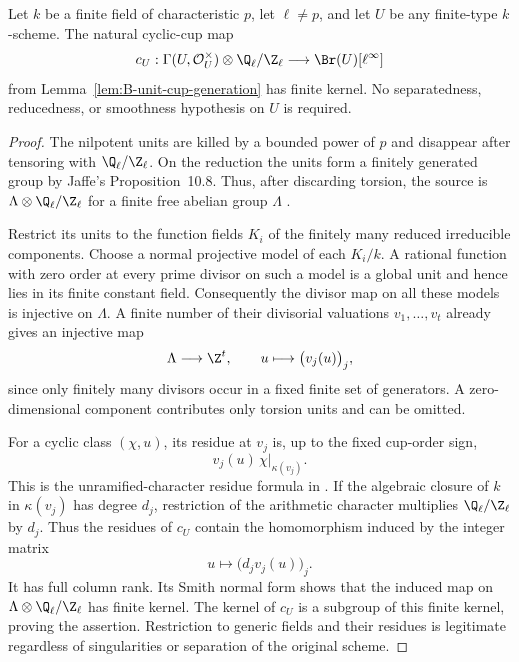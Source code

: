 \begin{lemma}
\label{lem:B-unit-cup-kernel}
Let \(k\) be a finite field of characteristic \(p\), let
\(\ell\ne p\), and let \(U\) be any finite-type
\(k\)-scheme.  The natural cyclic-cup map
\[
 c_U:\Gamma(U,\mathcal O_U^\times)\otimes
                 \Q_\ell/\Z_\ell
       \longrightarrow\Br(U)[\ell^\infty]
\]
from Lemma~\ref{lem:B-unit-cup-generation} has finite kernel.
No separatedness, reducedness, or smoothness hypothesis on
\(U\) is required.
\end{lemma}
\begin{proof}
The nilpotent units are killed by a bounded power of \(p\)
and disappear after tensoring with \(\Q_\ell/\Z_\ell\).
On the reduction the units form a finitely generated group by
Jaffe's Proposition~10.8.  Thus, after discarding torsion,
the source is \(\Lambda\otimes\Q_\ell/\Z_\ell\) for
a finite free abelian group \(\Lambda\)
\cite[Proposition~10.8]{BJaffe1994}.

Restrict its units to the function fields \(K_i\) of the
finitely many reduced irreducible components.  Choose a normal
projective model of each \(K_i/k\).  A rational function
with zero order at every prime divisor on such a model is a
global unit and hence lies in its finite constant field.
Consequently the divisor map on all these models is injective
on \(\Lambda\).  A finite number of their divisorial
valuations \(v_1,\ldots,v_t\) already gives an injective
map
\[
 \Lambda\longrightarrow\Z^t,
 \qquad u\longmapsto\bigl(v_j(u)\bigr)_j,
\]
since only finitely many divisors occur in a fixed finite set
of generators.  A zero-dimensional component contributes only
torsion units and can be omitted.

For a cyclic class \((\chi,u)\), its residue at \(v_j\)
is, up to the fixed cup-order sign,
\[
       v_j(u)\,\chi|_{\kappa(v_j)}.
\]
This is the unramified-character residue formula in
\citet[section~1.4.1, Proposition~1.4.5 and the cup-residue
formula immediately following it, author-draft p.~37]
       {DCTSkorobogatov2019}.
If the algebraic closure of \(k\) in \(\kappa(v_j)\)
has degree \(d_j\), restriction of the arithmetic character
multiplies \(\Q_\ell/\Z_\ell\) by \(d_j\).
Thus the residues of \(c_U\) contain the homomorphism
induced by the integer matrix
\[
             u\longmapsto\bigl(d_jv_j(u)\bigr)_j.
\]
It has full column rank.  Its Smith normal form shows that
the induced map on \(\Lambda\otimes\Q_\ell/\Z_\ell\)
has finite kernel.  The kernel of \(c_U\) is a subgroup of
this finite kernel, proving the assertion.  Restriction to
generic fields and their residues is legitimate regardless
of singularities or separation of the original scheme.
\end{proof}

